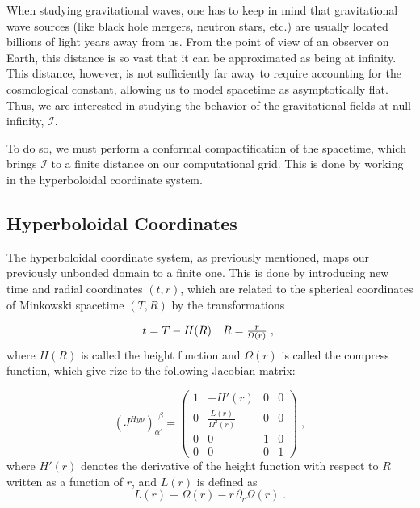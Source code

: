 When studying gravitational waves, one has to keep in mind that gravitational wave sources (like black hole mergers, neutron stars, etc.) are usually located billions of light years away from us. From the point of view of an observer on Earth, this distance is so vast that it can be approximated as being at infinity. This distance, however, is not sufficiently far away to require accounting for the cosmological constant, allowing us to model spacetime as asymptotically flat. Thus, we are interested in studying the behavior of the gravitational fields at null infinity, $\mathscr{I}$.

To do so, we must perform a conformal compactification of the spacetime, which brings $\mathscr{I}$ to a finite distance on our computational grid. This is done by working in the hyperboloidal coordinate system.

\subsection{Hyperboloidal Coordinates}

The hyperboloidal coordinate system, as previously mentioned, maps our previously unbonded domain to a finite one. This is done by introducing new time and radial coordinates $(t,r)$, which are related to the spherical coordinates of Minkowski spacetime $(T,R)$ by the transformations

\begin{equation}
    \begin{array}{c c} 
        t = T - H(R) & R = \frac{r}{\Omega(r)} \; ,
    \end{array} \; 
\end{equation}
%
where $H(R)$ is called the height function and $\Omega(r)$ is called the compress function, which give rize to the following Jacobian matrix:

\begin{equation}
    \left(J^{Hyp}\right)_{\alpha'}^{\ \ \beta} = 
    \begin{pmatrix}
        1 & -H'(r) & 0 & 0 \\
        0 & \frac{L(r)}{\Omega^2(r)} & 0 & 0 \\
        0 & 0 & 1 & 0 \\
        0 & 0 & 0 & 1
    \end{pmatrix} \; ,
\end{equation}
%
where $H'(r)$ denotes the derivative of the height function with respect to $R$ written as a function of $r$, and $L(r)$ is defined as
%
\begin{equation}
    L(r) \equiv \Omega(r) - r \, \partial_r \Omega(r) \; .
\end{equation}

